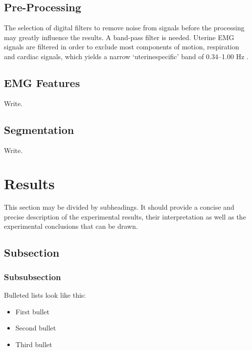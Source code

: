 \documentclass[bioengineering,article,submit,moreauthors,pdftex,10pt,a4paper]{mdpi}
\begin{document}
\subsection{Pre-Processing}

The selection of digital filters to remove noise from signals before the processing may greatly influence the results. A band-pass filter is needed.  Uterine EMG signals are filtered in order to exclude most components of motion, respiration and cardiac signals, which yields a narrow ‘uterinespecific’ band of 0.34–1.00 Hz \cite{ref-lucovnik}.



\subsection{EMG Features}

Write.


\subsection{Segmentation}

Write.






 
\section{Results}

This section may be divided by subheadings. It should provide a concise and precise description of the experimental results, their interpretation as well as the experimental conclusions that can be drawn.


\subsection{Subsection}

\subsubsection{Subsubsection}

Bulleted lists look like this:
\begin{itemize}[leftmargin=*,labelsep=5.8mm]
\item	First bullet
\item	Second bullet
\item	Third bullet
\end{itemize}
\end{document}
